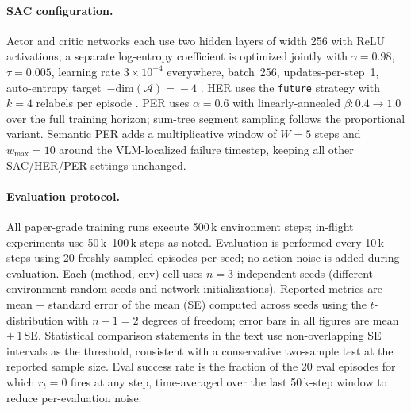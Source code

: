 \documentclass{article}
\begin{document}
\paragraph{SAC configuration.}
Actor and critic networks each use two hidden layers of width 256 with ReLU
activations; a separate log-entropy coefficient is optimized jointly with
$\gamma\!=\!0.98$, $\tau\!=\!0.005$, learning rate $3\!\times\!10^{-4}$
everywhere, batch~256, updates-per-step~1, auto-entropy
target~$-\text{dim}(\mathcal{A})\!=\!-4$ \citep{haarnoja2018sac}. HER uses the
\texttt{future} strategy with $k\!=\!4$ relabels per episode
\citep{andrychowicz2017her}. PER uses $\alpha\!=\!0.6$ with linearly-annealed
$\beta\colon0.4\!\to\!1.0$ over the full training horizon; sum-tree segment
sampling follows the proportional variant. Semantic PER adds a multiplicative
window of $W\!=\!5$ steps and $w_{\max}\!=\!10$ around the VLM-localized
failure timestep, keeping all other SAC/HER/PER settings unchanged.

\paragraph{Evaluation protocol.}
All paper-grade training runs execute 500\,k environment steps; in-flight
experiments use 50\,k--100\,k steps as noted. Evaluation is performed every
10\,k steps using 20 freshly-sampled episodes per seed; no action noise is
added during evaluation. Each (method, env) cell uses $n\!=\!3$ independent
seeds (different environment random seeds and network initializations).
Reported metrics are mean $\pm$ standard error of the mean (SE) computed
across seeds using the $t$-distribution with $n\!-\!1\!=\!2$ degrees of
freedom; error bars in all figures are mean\,$\pm$\,1\,SE. Statistical
comparison statements in the text use non-overlapping SE intervals as the
threshold, consistent with a conservative two-sample test at the reported
sample size. Eval success rate is the fraction of the 20 eval episodes for
which $r_t\!=\!0$ fires at any step, time-averaged over the last
50\,k-step window to reduce per-evaluation noise.
\end{document}
